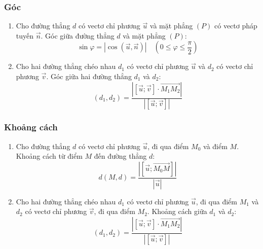 \begin{tomtat}
	\subsubsection{Góc}
	\begin{enumerate}
	\item Cho đường thẳng $d$ có vectơ chỉ phương $\vec{u}$ và mặt phẳng $ (P) $ có vectơ pháp tuyến $ \vec{n} $. Góc giữa đường thẳng $d$ và mặt phẳng $ (P) $: $$\sin\varphi=|\cos\left(\vec{u},\vec{n}\right)| \quad \left(0\leq \varphi \leq \dfrac{\pi}{2}\right)$$
	\item Cho hai đường thẳng chéo nhau $d_1$ có vectơ chỉ phương $\vec{u}$ và $d_2$ có vectơ chỉ phương $\vec{v}$. Góc giữa hai đường thẳng $ d_1 $ và $ d_2 $:
	$$\left(d_1,d_2\right)=\dfrac{\left|\left[\vec{u};\vec{v}\right]\cdot\vec{M_1M_2}\right|}{|\left[\vec{u};\vec{v}\right]|} $$
	\end{enumerate}
	\subsubsection{Khoảng cách}
	\begin{enumerate}
	\item Cho đường thẳng $d$ có vectơ chỉ phương $\vec{u}$, đi qua điểm $M_0$ và điểm $ M $. Khoảng cách từ điểm $ M $ đến đường thẳng $ d $:
	$$ d\left(M,d\right)=\dfrac{|\left[\vec{u};\vec{M_0M}\right]|}{|\vec{u}|}$$
	\item Cho hai đường thẳng chéo nhau $d_1$ có vectơ chỉ phương $\vec{u}$, đi qua điểm $M_1 $ và $d_2$ có vectơ chỉ phương $\vec{v}$, đi qua điểm $M_2$. Khoảng cách giữa $ d_1 $ và $ d_2 $:
	$$\left(d_1,d_2\right)=\dfrac{\left|\left[\vec{u};\vec{v}\right]\cdot\vec{M_1M_2}\right|}{|\left[\vec{u};\vec{v}\right]|}$$
	\end{enumerate}
	\end{tomtat}
